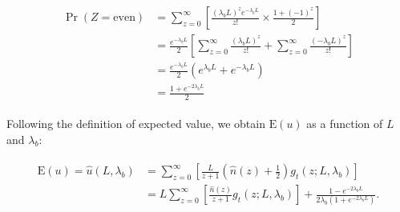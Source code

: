 \documentclass[11pt, class=article, crop=false]{standalone}
\begin{document}
\begin{align}
    \begin{split}
        \Pr(Z = \text{even}) &= \sum_{z = 0}^{\infty} \left[ \frac{(\lambda_b L)^{z} e^{-\lambda_b L}}{z!} \times \frac{1 + (-1)^{z}}{2} \right]\\
                         &= \frac{e^{-\lambda_b L}}{2} \left[ \sum_{z = 0}^{\infty} \frac{(\lambda_b L)^{z}}{z!} + \sum_{z = 0}^{\infty} \frac{(-\lambda_b L)^{z}}{z!}\right]\\
                         &= \frac{e^{-\lambda_b L}}{2} (e^{\lambda_b L} + e^{-\lambda_b L})\\
                         &= \frac{1 + e^{- 2 \lambda_b L}}{2}    
    \end{split}
\end{align}


Following the definition of expected value, we obtain $\mbox{E}(u)$ as a function of $L$ and $\lambda_b$:

\begin{align}
    \begin{split}
        \mbox{E}(u) = \hat{u}(L, \lambda_b) 
                    &= \sum_{z = 0}^{\infty} \left[ \frac{L}{z + 1} \left(\hat{n}(z) + \frac{1}{2}\right) g_t(z; L, \lambda_b) \right]\\
                    &= L \sum_{z = 0}^{\infty} \left[ \frac{\hat{n}(z)}{z + 1} g_t(z; L, \lambda_b)\right] + 
                    \frac{1 - e^{-2 \lambda_b L}}{2 \lambda_b (1 + e^{-2 \lambda_b L})}.
    \end{split}
\end{align}
\end{document}
